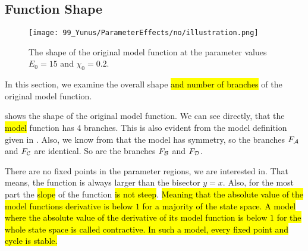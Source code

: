 \subsection{Function Shape}

\begin{figure}
	\centering
	\texttt{[image: 99\_Yunus/ParameterEffects/no/illustration.png]}
	\caption[Shape of the original model function]{
		The shape of the original model function at the parameter values $E_0 = 15$ and $\chi_0 = 0.2$.
	}
	\label{fig:setup.char.shape}
\end{figure}

In this section, we examine the overall shape \hl{and number of branches} of the original model function.

 shows the shape of the original model function.
We can see directly, that the \hl{model} function has 4 branches.
This is also evident from the model definition given in .
Also, we know from  that the model has symmetry, so the branches $F_{\mathcal{A}}$ and $F_{\mathcal{C}}$ are identical.
So are the branches $F_{\mathcal{B}}$ and $F_{\mathcal{D}}$.

There are no fixed points in the parameter regions, we are interested in.
That means, the function is always larger than the bisector $y=x$.
Also, for the most part the \hl{slope} of the function \hl{is not steep}.
\hl{
	Meaning that the absolute value of the model functions derivative is below $1$ for a majority of the state space.
	A model where the absolute value of the derivative of its model function is below $1$ for the whole state space is called contractive.
	In such a model, every fixed point and cycle is stable.
}
